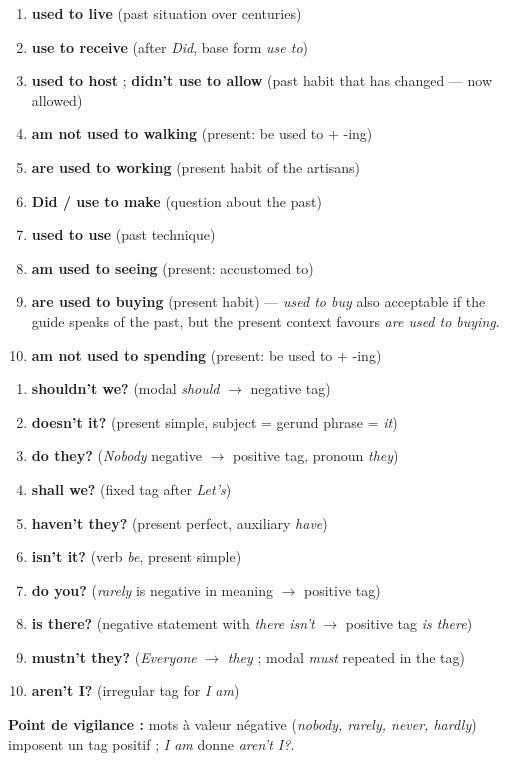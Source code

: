 \documentclass[11pt]{article}
\begin{document}
\begin{corrige}
\begin{enumerate}
    \item \textbf{used to live} (past situation over centuries)
    \item \textbf{use to receive} (after \emph{Did}, base form \emph{use to})
    \item \textbf{used to host} ; \textbf{didn't use to allow} (past habit that has changed — now allowed)
    \item \textbf{am not used to walking} (present: be used to + -ing)
    \item \textbf{are used to working} (present habit of the artisans)
    \item \textbf{Did / use to make} (question about the past)
    \item \textbf{used to use} (past technique)
    \item \textbf{am used to seeing} (present: accustomed to)
    \item \textbf{are used to buying} (present habit) — \emph{used to buy} also acceptable if the guide speaks of the past, but the present context favours \emph{are used to buying}.
    \item \textbf{am not used to spending} (present: be used to + -ing)
\end{enumerate}
\end{corrige}

\begin{corrige}
\begin{enumerate}
    \item \textbf{shouldn't we?} (modal \emph{should} $\rightarrow$ negative tag)
    \item \textbf{doesn't it?} (present simple, subject = gerund phrase = \emph{it})
    \item \textbf{do they?} (\emph{Nobody} negative $\rightarrow$ positive tag, pronoun \emph{they})
    \item \textbf{shall we?} (fixed tag after \emph{Let's})
    \item \textbf{haven't they?} (present perfect, auxiliary \emph{have})
    \item \textbf{isn't it?} (verb \emph{be}, present simple)
    \item \textbf{do you?} (\emph{rarely} is negative in meaning $\rightarrow$ positive tag)
    \item \textbf{is there?} (negative statement with \emph{there isn't} $\rightarrow$ positive tag \emph{is there})
    \item \textbf{mustn't they?} (\emph{Everyone} $\rightarrow$ \emph{they} ; modal \emph{must} repeated in the tag)
    \item \textbf{aren't I?} (irregular tag for \emph{I am})
\end{enumerate}
\textbf{Point de vigilance :} mots à valeur négative (\emph{nobody, rarely, never, hardly}) imposent un tag positif ; \emph{I am} donne \emph{aren't I?}.
\end{corrige}
\end{document}
